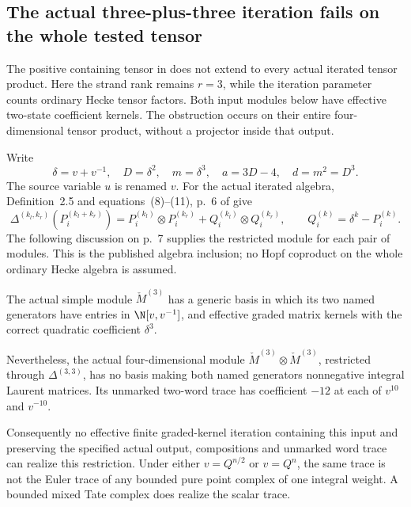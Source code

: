 \subsection{The actual three-plus-three iteration fails on the whole tested tensor}

The positive containing tensor in  does not
extend to every actual iterated tensor product.
Here the strand rank remains \(r=3\), while the
iteration parameter counts ordinary Hecke tensor
factors. Both input modules below have effective
two-state coefficient kernels. The obstruction
occurs on their entire four-dimensional tensor
product, without a projector inside that output.

Write
\[
 \delta=v+v^{-1},\quad D=\delta^2,\quad
 m=\delta^3,\quad a=3D-4,\quad d=m^2=D^3.
\]
The source variable \(u\) is renamed \(v\).
For the actual iterated algebra, Definition~2.5
and equations~(8)--(11), p.~6 of
\cite{BlasiakChebyshev} give
\begin{equation}\label{eq:sixTensorActualRestriction}
 \Delta^{(k_l,k_r)}(P_i^{(k_l+k_r)})
   =P_i^{(k_l)}\otimes P_i^{(k_r)}
       +Q_i^{(k_l)}\otimes Q_i^{(k_r)},
 \qquad Q_i^{(k)}=\delta^k-P_i^{(k)}.
\end{equation}
The following discussion on p.~7 supplies the
restricted module for each pair of modules.
This is the published algebra inclusion; no
Hopf coproduct on the whole ordinary Hecke
algebra is assumed.

\begin{finding}
\label{f:sixTensorWholeObstruction}
The actual simple module \(\check M^{(3)}\) has
a generic basis in which its two named generators
have entries in \(\N[v,v^{-1}]\), and effective
graded matrix kernels with the correct quadratic
coefficient \(\delta^3\).

Nevertheless, the actual four-dimensional module
\(\check M^{(3)}\otimes\check M^{(3)}\), restricted
through \(\Delta^{(3,3)}\), has no basis making
both named generators nonnegative integral
Laurent matrices. Its unmarked two-word trace
has coefficient \(-12\) at each of \(v^{10}\)
and \(v^{-10}\).

Consequently no effective finite graded-kernel
iteration containing this input and preserving
the specified actual output, compositions and
unmarked word trace can realize this restriction.
Under either \(v=Q^{n/2}\) or \(v=Q^n\), the
same trace is not the Euler trace of any bounded
pure point complex of one integral weight.
A bounded mixed Tate complex does realize the
scalar trace.
\end{finding}

